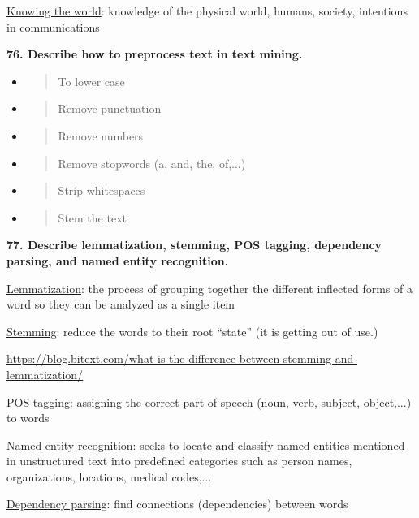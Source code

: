 \underline{Knowing the world}: knowledge of the physical world, humans,
society, intentions in communications

\textbf{76. Describe how to preprocess text in text mining.}

\begin{itemize}
\item
  \begin{quote}
  To lower case
  \end{quote}
\item
  \begin{quote}
  Remove punctuation
  \end{quote}
\item
  \begin{quote}
  Remove numbers
  \end{quote}
\item
  \begin{quote}
  Remove stopwords (a, and, the, of,...)
  \end{quote}
\item
  \begin{quote}
  Strip whitespaces
  \end{quote}
\item
  \begin{quote}
  Stem the text
  \end{quote}
\end{itemize}

\textbf{77. Describe lemmatization, stemming, POS tagging, dependency
parsing, and named entity recognition.}

\underline{Lemmatization}: the process of grouping together the
different inflected forms of a word so they can be analyzed as a single
item

\underline{Stemming}: reduce the words to their root ``state'' (it is
getting out of use.)

\href{https://blog.bitext.com/what-is-the-difference-between-stemming-and-lemmatization/}{\underline{https://blog.bitext.com/what-is-the-difference-between-stemming-and-lemmatization/}}

\underline{POS tagging}: assigning the correct part of speech (noun,
verb, subject, object,...) to words

\underline{Named entity recognition:} seeks to locate and classify named
entities mentioned in unstructured text into predefined categories such
as person names, organizations, locations, medical codes,...

\underline{Dependency parsing}: find connections (dependencies) between
words

